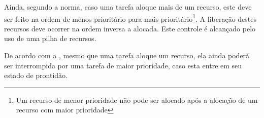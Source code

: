 
Ainda, segundo a norma, caso uma tarefa aloque mais de um recurso, este deve ser feito na ordem de menos prioritário para mais prioritário\footnote{Um recurso de menor prioridade não pode ser alocado após a alocação de um recurso com maior prioridade}. A liberação destes recursos deve ocorrer na ordem inversa a alocada. Este controle é alcançado pelo uso de uma pilha de recursos.

De acordo com a , mesmo que uma tarefa aloque um recurso, ela ainda poderá ser interrompida por uma tarefa de maior prioridade, caso esta entre em seu estado de prontidão.